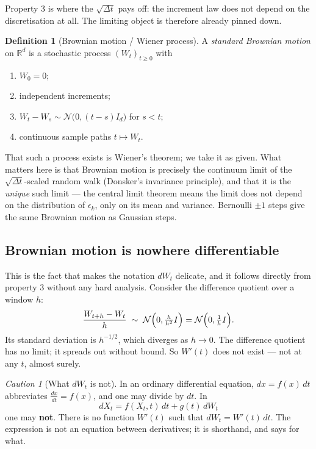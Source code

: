 \documentclass[11pt,a4paper]{report}
\theoremstyle{definition}
\newtheorem{definition}[definition]{Definition}
\theoremstyle{remark}
\newtheorem{caution}[caution]{Caution}
\newcommand{\RR}{\mathbb R}
\begin{document}
Property 3 is where the $\sqrt{\Delta t}$ pays off: the increment law does
not depend on the discretisation at all. The limiting object is therefore
already pinned down.

\begin{definition}[Brownian motion / Wiener process]
\label{def:brownian}
A \emph{standard Brownian motion} on $\RR^d$ is a stochastic process
$(W_t)_{t\ge0}$ with
\begin{enumerate}
\item $W_0=0$;
\item independent increments;
\item $W_t-W_s\sim\mathcal N\bigl(0,(t-s)I_d\bigr)$ for $s<t$;
\item continuous sample paths $t\mapsto W_t$.
\end{enumerate}
\end{definition}

That such a process exists is Wiener's theorem; we take it as given. What
matters here is that Brownian motion is precisely the continuum limit of the
$\sqrt{\Delta t}$-scaled random walk (Donsker's invariance principle), and
that it is the \emph{unique} such limit --- the central limit theorem means
the limit does not depend on the distribution of $\epsilon_k$, only on its
mean and variance. Bernoulli $\pm1$ steps give the same Brownian motion as
Gaussian steps.

\subsection{Brownian motion is nowhere differentiable}
\label{sec:sde-nondiff}

This is the fact that makes the notation $dW_t$ delicate, and it follows
directly from property 3 without any hard analysis. Consider the difference
quotient over a window $h$:
\begin{equation}
\frac{W_{t+h}-W_t}{h}\;\sim\;\mathcal N\Bigl(0,\tfrac{h}{h^2}I\Bigr)
=\mathcal N\Bigl(0,\tfrac1h I\Bigr).
\end{equation}
Its standard deviation is $h^{-1/2}$, which diverges as $h\to0$. The
difference quotient has no limit; it spreads out without bound. So $W'(t)$
does not exist --- not at any $t$, almost surely.

\begin{caution}[What $dW_t$ is not]
\label{caution:dW-not-derivative}
In an ordinary differential equation, $dx = f(x)\,dt$ abbreviates
$\frac{dx}{dt}=f(x)$, and one may divide by $dt$. In
\[
dX_t = f(X_t,t)\,dt + g(t)\,dW_t
\]
one may \textbf{not}. There is no function $W'(t)$ such that
$dW_t=W'(t)\,dt$. The expression is not an equation between derivatives; it
is shorthand, and  says for what.
\end{caution}
\end{document}
